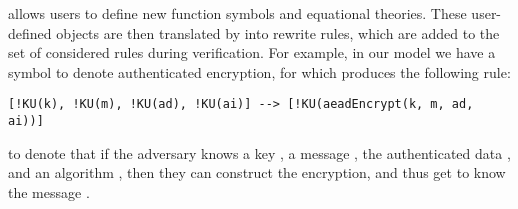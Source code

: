 %


\mTamarin{} allows users to define new function symbols and equational theories.
These user-defined objects are then translated by \mTamarin{} into rewrite
rules, which are added to the set of considered rules during verification.
For example, in our model we have a symbol to denote authenticated encryption,
for which \mTamarin{} produces the following rule:
%
\begin{lstlisting}
[!KU(k), !KU(m), !KU(ad), !KU(ai)] --> [!KU(aeadEncrypt(k, m, ad, ai))]
\end{lstlisting}
%
to denote that if the adversary knows a key , a message , the
authenticated data , and an algorithm , then they can construct
the encryption, and thus get to know the message
.



